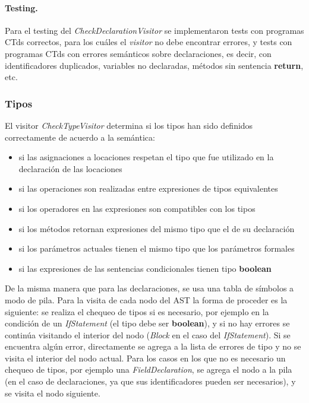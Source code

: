 \documentclass[11pt,a4paper]{article}
\begin{document}
\paragraph{Testing.} Para el testing del \textit{CheckDeclarationVisitor} se implementaron tests con programas CTds correctos, para los cuáles el \textit{visitor} no debe encontrar errores, y tests con programas CTds con errores semánticos sobre declaraciones, es decir, con identificadores duplicados, variables no declaradas, métodos sin sentencia \textbf{return}, etc.


\subsubsection{Tipos}
\label{subsec:tipos}

El visitor \textit{CheckTypeVisitor} determina si los tipos han sido definidos correctamente de acuerdo a la semántica: 
\begin{itemize}
	\item si las asignaciones a locaciones respetan el tipo que fue utilizado en la declaración de las locaciones
	\item si las operaciones son realizadas entre expresiones de tipos equivalentes
	\item si los operadores en las expresiones son compatibles con los tipos
	\item si los métodos retornan expresiones del mismo tipo que el de su declaración
	\item si los parámetros actuales tienen el mismo tipo que los parámetros formales
	\item si las expresiones de las sentencias condicionales tienen tipo \textbf{boolean}
\end{itemize}

De la misma manera que para las declaraciones, se usa una tabla de símbolos a modo de pila. Para la visita de cada nodo del AST la forma de proceder es la siguiente: se realiza el chequeo de tipos si es necesario, por ejemplo en la condición de un \textit{IfStatement} (el tipo debe ser \textbf{boolean}), y si no hay errores se continúa visitando el interior del nodo (\textit{Block} en el caso del \textit{IfStatement}). Si se encuentra algún error, directamente se agrega a la lista de errores de tipo y no se visita el interior del nodo actual. Para los casos en los que no es necesario un chequeo de tipos, por ejemplo una  \textit{FieldDeclaration}, se agrega el nodo a la pila (en el caso de declaraciones, ya que sus identificadores pueden ser necesarios), y se visita el nodo siguiente.
\end{document}

